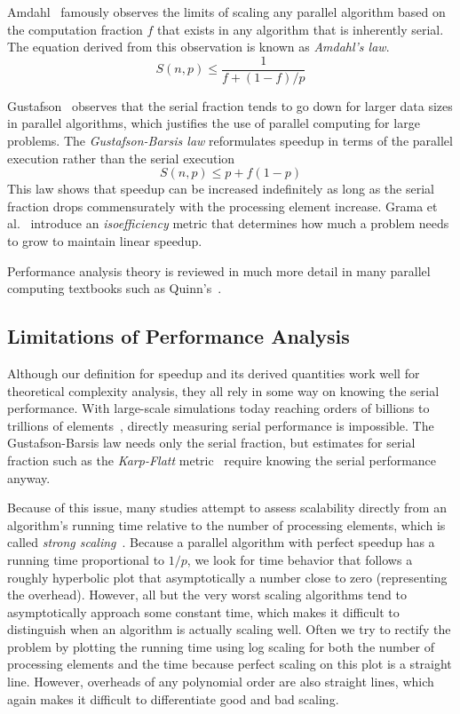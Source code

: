 \documentclass[conference]{IEEEtran}
\newcommand*{\lcite}[1]{~\cite{#1}}
\newcommand*{\scite}[1]{~\cite{#1}}
\newcommand{\etal}{et al.}
\newcommand*{\keyterm}[1]{\emph{#1}}
\begin{document}
Amdahl\scite{Amdahl1967} famously observes the limits of scaling any
parallel algorithm based on the computation fraction $f$ that exists in any
algorithm that is inherently serial. The equation derived from this
observation is known as \keyterm{Amdahl's law}.
\begin{equation}
  S(n,p) \leq \frac{1}{f + (1-f)/p}
  \label{eq:Amdahl}
\end{equation}

Gustafson\scite{Gustafson1988} observes that the serial fraction tends to
go down for larger data sizes in parallel algorithms, which justifies the
use of parallel computing for large problems. The \keyterm{Gustafson-Barsis
  law} reformulates speedup in terms of the parallel execution rather than
the serial execution
\begin{equation}
  S(n,p) \leq p + f(1-p)
  \label{eq:GustafsonBarsis}
\end{equation}
This law shows that speedup can be increased indefinitely as
long as the serial fraction drops commensurately with the processing
element increase. Grama \etal\scite{Grama1993} introduce an
\keyterm{isoefficiency} metric that determines how much a problem needs to
grow to maintain linear speedup.

Performance analysis theory is reviewed in much more detail in many
parallel computing textbooks such as Quinn's\scite{Quinn2004}.

\subsection{Limitations of Performance Analysis}

\noindent
Although our definition for speedup and its derived quantities work well
for theoretical complexity analysis, they all rely in some way on knowing
the serial performance. With large-scale simulations today reaching orders
of billions to trillions of
elements\lcite{Bernaschi2013,Rossinelli2013,Bussmann2013,Habib2013},
directly measuring serial performance is impossible. The Gustafson-Barsis
law needs only the serial fraction, but estimates for serial
fraction such as the \keyterm{Karp-Flatt} metric\lcite{Karp1990} require
knowing the serial performance anyway.

Because of this issue, many studies attempt to assess scalability directly
from an algorithm's running time relative to the number of processing
elements, which is called \keyterm{strong scaling}\lcite{Kaminsky2014}.
Because a parallel algorithm with perfect speedup has a running time
proportional to $1/p$, we look for time behavior that follows a roughly
hyperbolic plot that asymptotically a number close to zero (representing
the overhead). However, all but the very worst scaling algorithms tend to
asymptotically approach some constant time, which makes it difficult to
distinguish when an algorithm is actually scaling well. Often we try to
rectify the problem by plotting the running time using log scaling for both
the number of processing elements and the time because perfect scaling on
this plot is a straight line. However, overheads of any polynomial order
are also straight lines, which again makes it difficult to differentiate
good and bad scaling.
\end{document}
